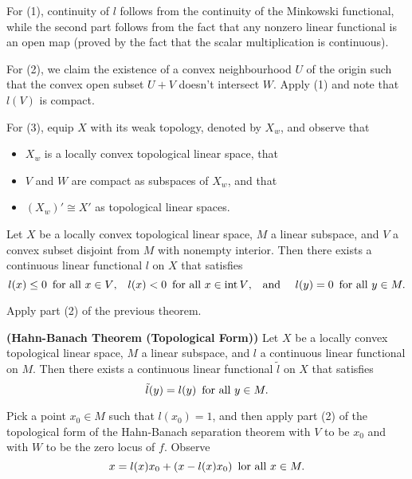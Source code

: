 \begin{hint}
  For (1), continuity of $l$ follows from the continuity of the Minkowski functional, while the second part follows from the fact that any nonzero linear functional is an open map (proved by the fact that the scalar multiplication is continuous).

  For (2), we claim the existence of a convex neighbourhood $U$ of the origin such that the convex open subset $U+V$ doesn't intersect $W$. Apply (1) and note that $l(V)$ is compact.

  For (3), equip $X$ with its weak topology, denoted by $X_w$, and observe that
  \begin{itemize}
    \item $X_w$ is a locally convex topological linear space, that
    \item $V$ and $W$ are compact as subspaces of $X_w$, and that
    \item $(X_w)'\cong X'$ as topological linear spaces.
  \end{itemize}
\end{hint}

\begin{corollary}[Mazur]
  Let $X$ be a locally convex topological linear space, $M$ a linear subspace, and $V$ a convex subset disjoint from $M$ with nonempty interior. Then there exists a continuous linear functional $l$ on $X$ that satisfies
  \begin{equation*}
    l(x) \leq 0\text{\enskip for all }x\in V\text{,\quad}l(x) < 0\text{\enskip for all }x\in \operatorname{int} V\text{,\quad and \quad}l(y) = 0\text{\enskip for all }y\in M.
  \end{equation*}
\end{corollary}

\begin{hint}
  Apply part (2) of the previous theorem.
\end{hint}

\begin{theorem}{\bf (Hahn-Banach Theorem (Topological Form))}
  Let $X$ be a locally convex topological linear space, $M$ a linear subspace, and $l$ a continuous linear functional on $M$. Then there exists a continuous linear functional $\tilde l$ on $X$ that satisfies
  \begin{equation*}
    \tilde l(y)=l(y)\text{\enskip for all }y\in M.
  \end{equation*}
\end{theorem}

\begin{hint}
  Pick a point $x_0\in M$ such that $l(x_0)=1$, and then apply part (2) of the topological form of the Hahn-Banach separation theorem with $V$ to be $x_0$ and with $W$ to be the zero locus of $f$. Observe
  \begin{equation*}
    x=l(x)x_0+(x-l(x)x_0)\text{\enskip lor all }x\in M.
  \end{equation*}
\end{hint}

